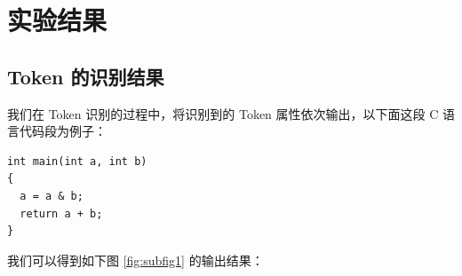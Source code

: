 \documentclass[UTF8]{ctexart}
\begin{document}
\section{实验结果}

\subsection{Token 的识别结果}
我们在 Token 识别的过程中，将识别到的 Token 属性依次输出，以下面这段 C 语言代码段为例子：

\begin{verbatim}
int main(int a, int b)
{
  a = a & b;
  return a + b;
}
\end{verbatim}

我们可以得到如下图 \ref{fig:subfig1} 的输出结果：
\end{document}
